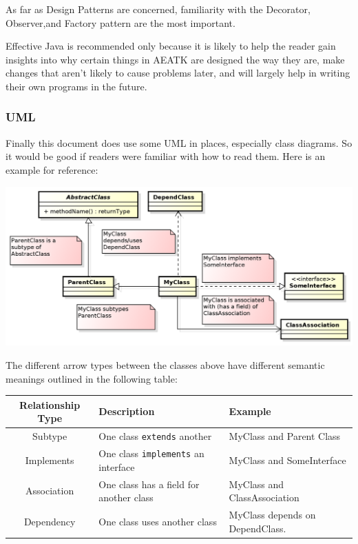 \documentclass[11pt,letterpaper,oneside]{article}
\begin{document}
As far as Design Patterns are concerned, familiarity with the Decorator, Observer,and Factory pattern are the most important.

Effective Java is recommended only because it is likely to help the reader gain insights into why certain things in AEATK are designed the way they are, make changes that aren't likely to cause problems later, and will largely help in writing their own programs in the future.

\subsubsection{UML}

Finally this document does use some UML in places, especially class diagrams. So it would be good if readers were familiar with how to read them. Here is an example for reference:

\begin{center}
\includegraphics[scale=0.65]{img/UML/ClassDiagram.png}
\end{center}

The different arrow types between the classes above have different semantic meanings outlined in the following table:

\begin{tabular}{c | l | l}
Relationship Type & Description & Example\\
\hline
\hline
Subtype & One class \texttt{extends} another & MyClass and Parent Class\\
Implements & One class \texttt{implements} an interface & MyClass and SomeInterface\\
Association & One class has a field for another class & MyClass and ClassAssociation\\
Dependency & One class uses another class & MyClass depends on DependClass.\\
\hline
\end{tabular}
~\\~
\\
\end{document}
